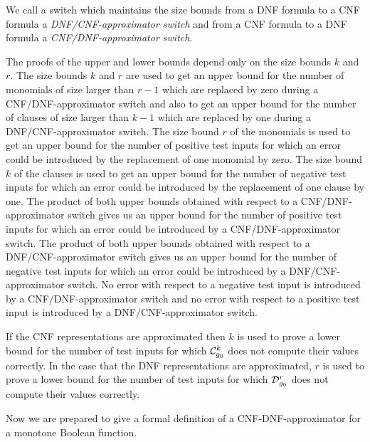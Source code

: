 \documentclass[11pt]{article}
\begin{document}
We call a switch which maintains the size bounds from a DNF formula to a CNF formula a
{\em DNF/CNF-approximator switch\/} and from a CNF formula to a DNF formula a {\em CNF/DNF-approximator switch\/}.

The proofs of the upper and lower bounds depend only on the size bounds $k$ and $r$.
The size bounds $k$ and $r$ are used to get an upper bound for the number of monomials of size larger than $r-1$
which are replaced by zero during a CNF/DNF-approximator switch and also to get an upper bound for the number of
clauses of size larger than $k-1$  which are replaced by one during a DNF/CNF-approximator switch.
The size bound $r$ of the monomials is used to get an upper bound for the number of positive test inputs for which
an error could be introduced by the replacement of one monomial by zero.
The size bound $k$ of the clauses is used to get an upper bound for the number of negative test inputs for which an
error could be introduced by the replacement of one clause by one.
The product of both upper bounds obtained with respect to a CNF/DNF-approximator switch gives us an upper bound for
the number of positive test inputs for which an error could be introduced by a CNF/DNF-approximator switch.
The product of both upper bounds obtained with respect to a DNF/CNF-approximator switch gives us an upper bound for
the number of negative test inputs for which an error could be introduced by a DNF/CNF-approximator switch.
No error with respect to a negative test input is introduced by a CNF/DNF-approximator switch and no error with
respect to a positive test input is introduced by a DNF/CNF-approximator switch. 

If the CNF representations are approximated then $k$ is used to prove a lower bound for the number of test inputs
for which ${\cal C}_{g_0}^k$ does not compute their values correctly. In the case that the DNF representations are
approximated, $r$ is used to prove a lower bound for the number of test inputs for which ${\cal D}_{g_0}^r$ does not
compute their values correctly.

Now we are prepared to give a formal definition of a CNF-DNF-approxi\-ma\-tor for a monotone Boolean function.
\end{document}
